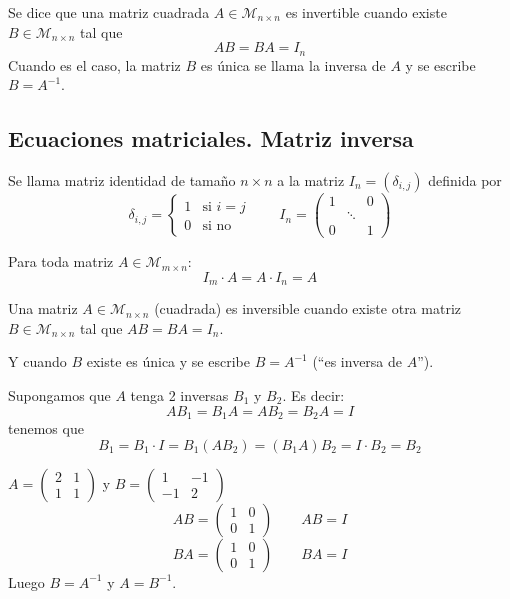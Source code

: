 \documentclass[11pt,a4paper]{article}
\newcommand{\M}{\mathcal{M}}
\begin{document}
\begin{definicion}
Se dice que una matriz cuadrada $A\in\M_{n\times n}$ es invertible cuando existe $B\in\M_{n\times n}$ tal que
\[
AB=BA=I_n
\]
Cuando es el caso, la matriz $B$ es única se llama la inversa de $A$ y se escribe $B=A^{-1}$.
\end{definicion}


\subsection{Ecuaciones matriciales. Matriz inversa}

\begin{definicion}
Se llama matriz identidad de tamaño $n\times n$ a la matriz $I_n=(\delta_{i,j})$ definida por
\[
\delta_{i,j}=\begin{cases}1 & \text{si } i=j\\ 0 & \text{si no}\end{cases}
\qquad
I_n=\begin{pmatrix}1&&0\\&\ddots&\\0&&1\end{pmatrix}
\]
\end{definicion}

\begin{proposicion}
Para toda matriz $A\in\M_{m\times n}$:
\[
I_m\cdot A=A\cdot I_n=A
\]
\end{proposicion}

\begin{definicion}
Una matriz $A\in\M_{n\times n}$ (cuadrada) es inversible cuando existe otra matriz $B\in\M_{n\times n}$ tal que $AB=BA=I_n$.

Y cuando $B$ existe es única y se escribe $B=A^{-1}$ (``es inversa de $A$'').
\end{definicion}

\begin{demo}
Supongamos que $A$ tenga 2 inversas $B_1$ y $B_2$. Es decir:
\[
AB_1=B_1A=AB_2=B_2A=I
\]
tenemos que
\[
B_1=B_1\cdot I=B_1(AB_2)=(B_1A)B_2=I\cdot B_2=B_2
\]
\end{demo}

\begin{ejemplo}
$A=\begin{pmatrix}2&1\\1&1\end{pmatrix}$ y $B=\begin{pmatrix}1&-1\\-1&2\end{pmatrix}$
\[
AB=\begin{pmatrix}1&0\\0&1\end{pmatrix}\qquad AB=I
\]
\[
BA=\begin{pmatrix}1&0\\0&1\end{pmatrix}\qquad BA=I
\]
Luego $B=A^{-1}$ y $A=B^{-1}$.
\end{ejemplo}
\end{document}
